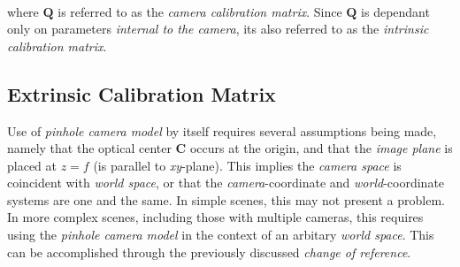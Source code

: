 \begin{equation*}
\begin{split}
\end{split}
\end{equation*}%
where $\mathbf{Q}$ is referred to as the \textit{camera calibration matrix}. Since $\mathbf{Q}$ is dependant only on parameters \textit{internal to the camera}, its also referred to as the \textit{intrinsic calibration matrix}. 


\subsection{Extrinsic Calibration Matrix}

\par Use of \textit{pinhole camera model} by itself requires several assumptions being made, namely that the optical center $\mathbf{C}$ occurs at the origin, and that the \textit{image plane} is placed at $z=f$ (is parallel to \textit{xy}-plane). This implies the \textit{camera space} is coincident with \textit{world space}, or that the \textit{camera}-coordinate and \textit{world}-coordinate systems are one and the same. In simple scenes, this may not present a problem. In more complex scenes, including those with multiple cameras, this requires using the \textit{pinhole camera model} in the context of an arbitary \textit{world space}. This can be accomplished through the previously discussed \textit{change of reference}.
 
